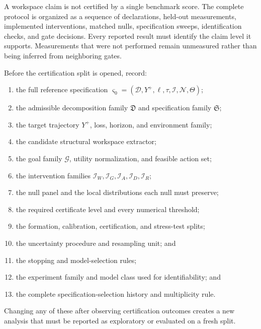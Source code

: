 

A workspace claim is not certified by a single benchmark score. The complete
protocol is organized as a sequence of declarations, held-out measurements,
implemented interventions, matched nulls, specification sweeps, identification
checks, and gate decisions. Every reported
result must identify the claim level it supports. Measurements that were not
performed remain unmeasured rather than being inferred from neighboring gates.


Before the certification split is opened, record:
\begin{enumerate}
\item the full reference specification
 \(\varsigma_0=(\mathcal D,Y^+,\ell,\tau,\mathcal I,\mathcal N,\Theta)\);
\item the admissible decomposition family \(\mathfrak D\) and specification
 family \(\mathfrak S\);
\item the target trajectory \(Y^+\), loss, horizon, and environment family;
\item the candidate structural workspace extractor;
\item the goal family \(\mathcal G\), utility normalization, and feasible
 action set;
\item the intervention families \(\mathcal I_W,\mathcal I_G,\mathcal I_A,
 \mathcal I_D,\mathcal I_R\);
\item the null panel and the local distributions each null must preserve;
\item the required certificate level and every numerical threshold;
\item the formation, calibration, certification, and stress-test splits;
\item the uncertainty procedure and resampling unit; and
\item the stopping and model-selection rules;
\item the experiment family and model class used for identifiability; and
\item the complete specification-selection history and multiplicity rule.
\end{enumerate}
Changing any of these after observing certification outcomes creates a new
analysis that must be reported as exploratory or evaluated on a fresh split.

